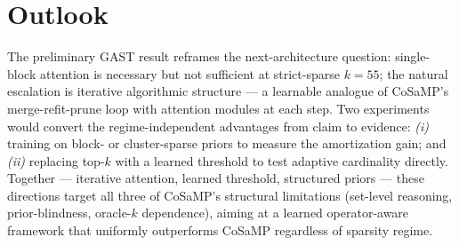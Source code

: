 \documentclass[conference,10pt]{IEEEtran}
\begin{document}
\section{Outlook}
The preliminary GAST result reframes the next-architecture question:
single-block attention is necessary but not sufficient at
strict-sparse $k{=}55$; the natural escalation is iterative
algorithmic structure --- a learnable analogue of CoSaMP's
merge-refit-prune loop with attention modules at each step. Two
experiments would convert the regime-independent advantages from
claim to evidence: {\it (i)} training on block- or cluster-sparse
priors to measure the amortization gain; and {\it (ii)} replacing
top-$k$ with a learned threshold to test adaptive cardinality
directly. Together --- iterative attention, learned threshold,
structured priors --- these directions target all three of CoSaMP's
structural limitations (set-level reasoning, prior-blindness,
oracle-$k$ dependence), aiming at a learned operator-aware framework
that uniformly outperforms CoSaMP regardless of sparsity regime.
\end{document}
